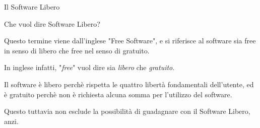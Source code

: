 \begin{slide}{Il Software Libero}

{\small 

{\red Che vuol dire Software Libero?} 

Questo termine viene dall'inglese "Free Software", e si riferisce al
software sia free in senso di libero che free nel senso di gratuito.

In inglese infatti, "\emph{free}" vuol dire sia \emph{libero} che
\emph{gratuito}.

Il software è libero perchè rispetta le quattro libertà fondamentali
dell'utente, ed è gratuito perchè non è richiesta alcuna somma per
l'utilizzo del software.

Questo tuttavia non esclude la possibilità di guadagnare con il Software
Libero, anzi.
}

\end{slide}
